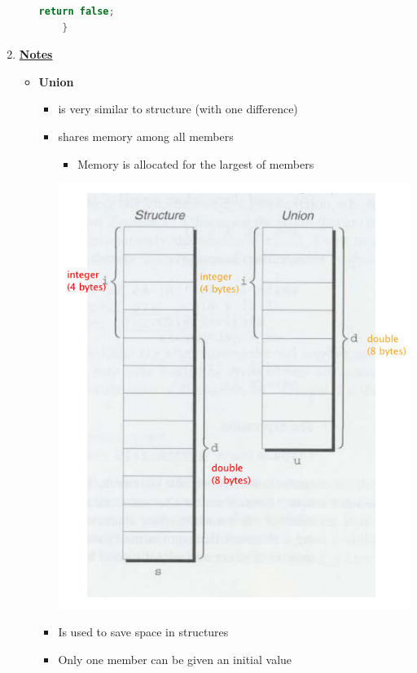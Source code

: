 \documentclass[12pt]{article}
\begin{document}
\begin{enumerate}[1.]
\begin{enumerate}[a)]
\begin{lstlisting}[language=c]
        return false;
    }
\end{lstlisting}

    \end{enumerate}

    \item

    \bigskip

    \underline{\textbf{Notes}}

    \begin{itemize}
        \item \textbf{Union}

        \begin{itemize}
            \item is very similar to structure (with one difference)
            \item shares memory among all members
            \begin{itemize}
                \item Memory is allocated for the largest of members
            \end{itemize}

            \bigskip

            \begin{center}
            \includegraphics[width=0.6\linewidth]{images/review_7_solution_9.png}
            \end{center}

            \item Is used to save space in structures
            \item Only one member can be given an initial value


\end{itemize}
\end{itemize}
\end{enumerate}
\end{document}
